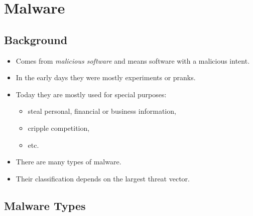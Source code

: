 \section{Malware}

\subsection{Background}

\begin{frame}
  \begin{itemize}
    \item Comes from \emph{malicious software} and means software with 
      a malicious intent.

    \item In the early days they were mostly experiments or pranks.

    \item Today they are mostly used for special purposes:
      \begin{itemize}
        \item steal personal, financial or business information,
        \item cripple competition,
        \item etc.
      \end{itemize}

  \end{itemize}
\end{frame}

\begin{frame}
  \begin{itemize}
    \item There are many types of malware.

    \item Their classification depends on the largest threat vector.

  \end{itemize}
\end{frame}

\subsection{Malware Types}

